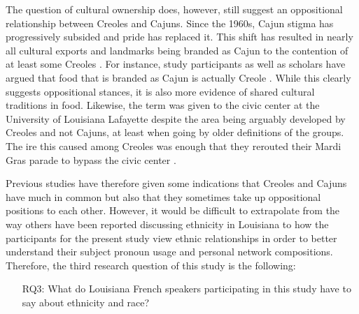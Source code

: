     The question of cultural ownership does, however, still suggest an oppositional relationship between Creoles and Cajuns.
    Since the 1960s, Cajun stigma has progressively subsided and pride has replaced it.
    This shift has resulted in nearly all cultural exports and landmarks being branded as Cajun to the contention of at least some Creoles \parencite{giancarlo_dont_2019}.
    For instance, study participants as well as scholars have argued that food that is branded as Cajun is actually Creole \parencite[pp.~39-40]{giancarlo_dont_2019}.
    While this clearly suggests oppositional stances, it is also more evidence of shared cultural traditions in food.
    Likewise, the term  was given to the civic center at the University of Louisiana Lafayette despite the area being arguably developed by Creoles and not Cajuns, at least when going by older definitions of the groups.
    The ire this caused among Creoles was enough that they rerouted their Mardi Gras parade to bypass the civic center \parencite[p.~36]{giancarlo_dont_2019}.

    Previous studies have therefore given some indications that Creoles and Cajuns have much in common but also that they sometimes take up oppositional positions to each other.
    However, it would be difficult to extrapolate from the way others have been reported discussing ethnicity in Louisiana to how the participants for the present study view ethnic relationships in order to better understand their subject pronoun usage and personal network compositions.
    Therefore, the third research question of this study is the following:
    \begin{itemize}
      \item[RQ3:] What do Louisiana French speakers participating in this study have to say about ethnicity and race?
    \end{itemize}
